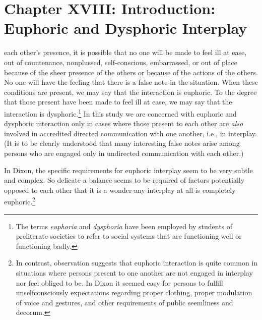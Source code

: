 \documentclass[openany,nobib]{tufte-book}
\let\oldchapter\chapter
\def\chapter{%
  \setcounter{footnote}{0}%
  \oldchapter
}
\begin{document}
\chapter[CHAPTER XVIII: INTRODUCTION: EUPHORIC AND DYSPHORIC INTERPLAY]{Chapter XVIII: Introduction: Euphoric and Dysphoric Interplay}
\label{ch:Chapter XVIII: Introduction: Euphoric and Dysphoric Interplay}

each other's presence, it is possible that no one
will be made to feel ill at ease, out of countenance, nonplussed,
self-conscious, embarrassed, or out of place because of the sheer
presence of the others or because of the actions of the others. No one
will have the feeling that there is a false note in the situation. When
these conditions are present, we may say that the interaction is
euphoric. To the degree that those present have been made to feel ill at
ease, we may say that the interaction is dysphoric.\footnote{The terms
  \emph{euphoria} and \emph{dysphoria} have been employed by students of
  preliterate societies to refer to social systems that are functioning
  well or functioning badly.} In this study we are concerned with
euphoric and dysphoric interaction only in cases where those present to
each other are \emph{also} involved in accredited directed communication
with one another, i.e., in interplay. (It is to be clearly understood
that many interesting false notes arise among persons who are engaged
only in undirected communication with each other.)

In Dixon, the specific requirements for euphoric interplay seem to be
very subtle and complex. So delicate a balance seems to be required of
factors potentially opposed to each other that it is a wonder any
interplay at all is completely euphoric.\footnote{In contrast,
  observation suggests that euphoric interaction is quite common in
  situations where persons present to one another are not engaged in
  interplay nor feel obliged to be. In Dixon it seemed easy for persons
  to fulfill unselfconsciously expectations regarding proper clothing,
  proper modulation of voice and gestures, and other requirements of
  public seemliness and decorum.}

\enlargethispage{\baselineskip}
\end{document}

